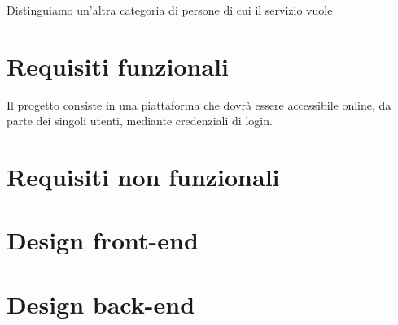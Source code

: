 \documentclass[11pt, a4paper]{article}
\begin{document}
Distinguiamo un'altra categoria di persone di cui il servizio vuole

\section{Requisiti funzionali}
Il progetto consiste in una piattaforma che dovrà essere accessibile online, da parte dei singoli utenti, mediante credenziali di login.


\section{Requisiti non funzionali}
\section{Design front-end}
\section{Design back-end}
\end{document}
